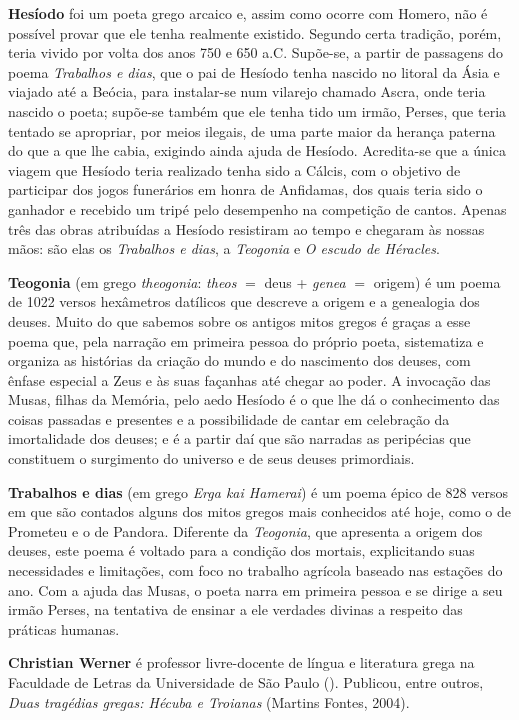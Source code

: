 \textbf{Hesíodo} foi um poeta grego arcaico e, assim como ocorre com Homero,
não é possível provar que ele tenha realmente existido. Segundo certa tradição,
porém, teria vivido por volta dos anos 750 e 650 a.C.  Supõe-se, a partir de
passagens do poema \textit{Trabalhos e dias}, que o pai de Hesíodo tenha
nascido no litoral da Ásia e viajado até a Beócia, para instalar-se num
vilarejo chamado Ascra, onde teria nascido o poeta; supõe-se também que ele
tenha tido um irmão, Perses, que teria tentado se apropriar, por meios ilegais,
de uma parte maior da herança paterna do que a que lhe cabia, exigindo ainda
ajuda de Hesíodo. Acredita-se que a única viagem que Hesíodo teria realizado
tenha sido a Cálcis, com o objetivo de participar dos jogos funerários em honra
de Anfidamas, dos quais teria sido o ganhador e recebido um tripé pelo
desempenho na competição de cantos. Apenas três das obras atribuídas a Hesíodo
resistiram ao tempo e chegaram às nossas mãos: são elas os \textit{Trabalhos e
dias}, a \textit{Teogonia} e \textit{O escudo de Héracles}.


\textbf{Teogonia} (em grego \textit{theogonia}: \textit{theos} $=$ deus +
\textit{genea} $=$ origem) é um poema de 1022 versos hexâmetros datílicos que
descreve a origem e a genealogia dos deuses. Muito do que sabemos sobre os
antigos mitos gregos é graças a esse poema que, pela narração em primeira
pessoa do próprio poeta, sistematiza e organiza as histórias da criação do
mundo e do nascimento dos deuses, com ênfase especial a Zeus e às suas façanhas
até chegar ao poder. A invocação das Musas, filhas da Memória, pelo aedo
Hesíodo é o que lhe dá o conhecimento das coisas passadas e presentes e a
possibilidade de cantar em celebração da imortalidade dos deuses; e é a partir
daí que são narradas as peripécias que constituem o surgimento do universo e de
seus deuses primordiais.  


\textbf{Trabalhos e dias} (em grego \textit{Erga kai Hamerai}) é um poema épico
de 828 versos em que são contados alguns dos mitos gregos mais conhecidos até
hoje, como o de Prometeu e o de Pandora. Diferente da \textit{Teogonia}, que
apresenta a origem dos deuses, este poema é voltado para a condição dos
mortais, explicitando suas necessidades e limitações, com foco no trabalho
agrícola baseado nas estações do ano. Com a ajuda das Musas, o poeta narra em
primeira pessoa e se dirige a seu irmão Perses, na tentativa de ensinar a ele
verdades divinas a respeito das práticas humanas.


\textbf{Christian Werner} é professor livre-docente de língua e literatura
grega na Faculdade de Letras da Universidade de São Paulo ().
Publicou, entre outros, \textit{Duas tragédias gregas: Hécuba e Troianas}
(Martins Fontes, 2004).







